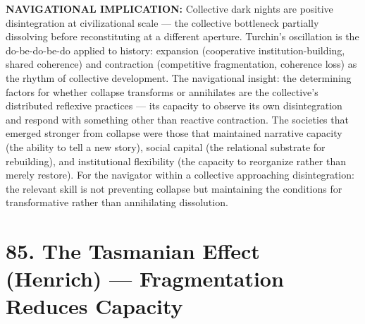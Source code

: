 \textbf{NAVIGATIONAL IMPLICATION:} Collective dark nights are positive disintegration at civilizational scale — the collective bottleneck partially dissolving before reconstituting at a different aperture. Turchin's oscillation is the do-be-do-be-do applied to history: expansion (cooperative institution-building, shared coherence) and contraction (competitive fragmentation, coherence loss) as the rhythm of collective development. The navigational insight: the determining factors for whether collapse transforms or annihilates are the collective's distributed reflexive practices — its capacity to observe its own disintegration and respond with something other than reactive contraction. The societies that emerged stronger from collapse were those that maintained narrative capacity (the ability to tell a new story), social capital (the relational substrate for rebuilding), and institutional flexibility (the capacity to reorganize rather than merely restore). For the navigator within a collective approaching disintegration: the relevant skill is not preventing collapse but maintaining the conditions for transformative rather than annihilating dissolution.


\bigskip\noindent\makebox[\textwidth]{\color{rulegray}\rule{5cm}{0.3pt}}\bigskip


\section*{85. The Tasmanian Effect (Henrich) — Fragmentation Reduces Capacity}


